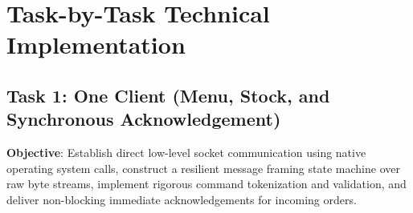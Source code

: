 \documentclass[11pt,a4paper]{article}
\begin{document}
\section{Task-by-Task Technical Implementation}

\subsection{Task 1: One Client (Menu, Stock, and Synchronous Acknowledgement)}
\textbf{Objective}: Establish direct low-level socket communication using native operating system calls, construct a resilient message framing state machine over raw byte streams, implement rigorous command tokenization and validation, and deliver non-blocking immediate acknowledgements for incoming orders.
\end{document}

